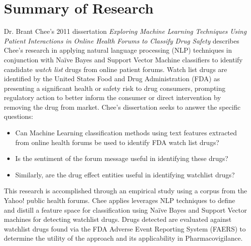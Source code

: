 \documentclass[twoside,11pt]{article}
\begin{document}
\section{Summary of Research}
Dr. Brant Chee's 2011 dissertation \textit{Exploring Machine Learning Techniques Using
Patient Interactions in Online Health Forums to Classify Drug Safety} describes
Chee's research in applying natural language processing (NLP) techniques in conjunction with Na\"ive Bayes and Support Vector Machine classifiers to identify candidate \textit{watch list} drugs from online patient forums. Watch list drugs are identified by the United States Food and Drug Administration (FDA) as presenting a significant health or safety risk to drug consumers, prompting regulatory action to better inform the consumer or direct intervention by removing the drug from market. Chee's dissertation seeks to answer the specific questions:
\begin{itemize}
  \item Can Machine Learning classification methods using text features extracted from online health forums be used to identify FDA watch list drugs?
  \item Is the sentiment of the forum message useful in identifying these drugs?
  \item Similarly, are the drug effect entities useful in identifying watchlist drugs?
\end{itemize}

This research is accomplished through an empirical study using a corpus from the
Yahoo! public health forums. Chee applies leverages NLP techniques to define and distill a feature space for classification using Na\"ive Bayes and
Support Vector machines for detecting watchlist drugs. Drugs detected are
evaluated against watchlist drugs found via the FDA Adverse Event Reporting System (FAERS) to determine the utility of the approach and its applicability in Pharmacovigilance.
\end{document}

